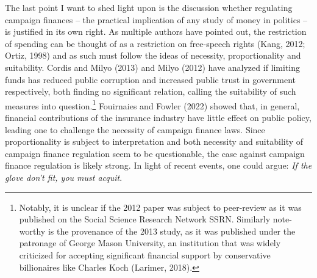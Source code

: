 \documentclass[11pt,a4paper]{article}
\begin{document}
The last point I want to shed light upon is the discussion whether regulating campaign finances – the practical implication of any study of money in politics – is justified in its own right. As multiple authors have pointed out, the restriction of spending can be thought of as a restriction on free-speech rights (Kang, 2012; Ortiz, 1998) and as such must follow the ideas of necessity, proportionality and suitability. Cordis and Milyo (2013) and Milyo (2012) have analyzed if limiting funds has reduced public corruption and increased public trust in government respectively, both finding no significant relation, calling the suitability of such measures into question.\footnote{Notably, it is unclear if the 2012 paper was subject to peer-review as it was published on the Social Science Research Network SSRN. Similarly note-worthy is the provenance of the 2013 study, as it was published under the patronage of George Mason University, an institution that was widely criticized for accepting significant financial support by conservative billionaires like Charles Koch (Larimer, 2018).} Fouirnaies and Fowler (2022) showed that, in general, financial contributions of the insurance industry have little effect on public policy, leading one to challenge the necessity of campaign finance laws. Since proportionality is subject to interpretation and both necessity and suitability of campaign finance regulation seem to be questionable, the case against campaign finance regulation is likely strong. In light of recent events, one could argue: \textit{If the glove don’t fit, you must acquit}.
\end{document}
